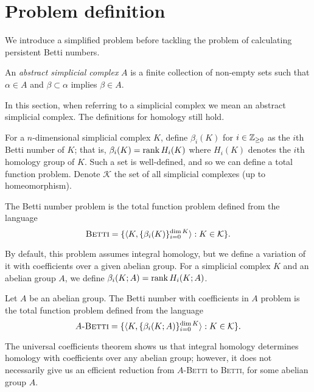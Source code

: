\section{Problem definition}

We introduce a simplified problem before tackling the problem of calculating persistent Betti numbers.

\begin{definition}
  An \emph{abstract simplicial complex} $A$ is a finite collection of non-empty sets such that $\alpha \in A$ and $\beta \subset \alpha$ implies $\beta \in A$.
\end{definition}

In this section, when referring to a simplicial complex we mean an abstract simplicial complex. The definitions for homology still hold.

For a $n$-dimensional simplicial complex $K$, define $\beta_i(K)$ for $i \in \mathbb{Z}_{\geq 0}$ as the $i$th Betti number of $K$; that is, $\beta_i(K) = \operatorname*{rank} H_i(K)$ where $H_i(K)$ denotes the $i$th homology group of $K$. Such a set is well-defined, and so we can define a total function problem. Denote $\mathcal K$ the set of all simplicial complexes (up to homeomorphism).

\begin{problem}[Betti]
The Betti number problem is the total function problem defined from the language
\[\textsc{Betti} = \{ \langle K, \{\beta_i(K)\}_{i=0}^{\dim K} \rangle: K \in \mathcal K\}. \]
\end{problem}

By default, this problem assumes integral homology, but we define a variation of it with coefficients over a given abelian group. For a simplicial complex $K$ and an abelian group $A$, we define $\beta_i(K; A) = \operatorname*{rank} H_i(K; A)$.

\begin{problem}
Let $A$ be an abelian group. The Betti number with coefficients in $A$ problem is the total function problem defined from the language
\[\textsc{$A$-Betti} = \{ \langle K, \{\beta_i(K; A)\}_{i=0}^{\dim K} \rangle: K \in \mathcal K\}. \]
\end{problem}

\begin{remark}
  The universal coefficients theorem shows us that integral homology determines homology with coefficients over any abelian group; however, it does not necessarily give us an efficient reduction from \textsc{$A$-Betti} to \textsc{Betti}, for some abelian group $A$.
\end{remark}


